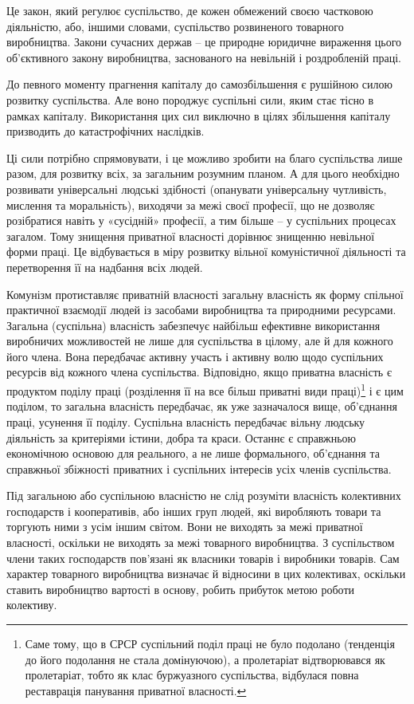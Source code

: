 \documentclass[../main]{subfiles}
\begin{document}
Це закон, який регулює суспільство, де кожен обмежений своєю частковою діяльністю, або, іншими словами, суспільство розвиненого товарного виробництва. Закони сучасних держав – це природне юридичне вираження цього об’єктивного закону виробництва, заснованого на невільній і роздробленій праці.

До певного моменту прагнення капіталу до самозбільшення є рушійною силою розвитку суспільства. Але воно породжує суспільні сили, яким стає тісно в рамках капіталу. Використання цих сил виключно в цілях збільшення капіталу призводить до катастрофічних наслідків.

Ці сили потрібно спрямовувати, і це можливо зробити на благо суспільства лише разом, для розвитку всіх, за загальним розумним планом. А для цього необхідно розвивати універсальні людські здібності (опанувати універсальну чутливість, мислення та моральність), виходячи за межі своєї професії, що не дозволяє розібратися навіть у «сусідній» професії, а тим більше – у суспільних процесах загалом. Тому знищення приватної власності дорівнює знищенню невільної форми праці. Це відбувається в міру розвитку вільної комуністичної діяльності та перетворення її на надбання всіх людей.

Комунізм протиставляє приватній власності загальну власність як форму спільної практичної взаємодії людей із засобами виробництва та природними ресурсами. Загальна (суспільна) власність забезпечує найбільш ефективне використання виробничих можливостей не лише для суспільства в цілому, але й для кожного його члена. Вона передбачає активну участь і активну волю щодо суспільних ресурсів від кожного члена суспільства. Відповідно, якщо приватна власність є продуктом поділу праці (розділення її на все більш приватні види праці)\footnote{Саме тому, що в СРСР суспільний поділ праці не було подолано (тенденція до його подолання не стала домінуючою), а пролетаріат відтворювався як пролетаріат, тобто як клас буржуазного суспільства, відбулася повна реставрація панування приватної власності.} і є цим поділом, то загальна власність передбачає, як уже зазначалося вище, об’єднання праці, усунення її поділу. Суспільна власність передбачає вільну людську діяльність за критеріями істини, добра та краси. Останнє є справжньою економічною основою для реального, а не лише формального, об’єднання та справжньої збіжності приватних і суспільних інтересів усіх членів суспільства.

Під загальною або суспільною власністю не слід розуміти власність колективних господарств і кооперативів, або інших груп людей, які виробляють товари та торгують ними з усім іншим світом. Вони не виходять за межі приватної власності, оскільки не виходять за межі товарного виробництва. З суспільством члени таких господарств пов’язані як власники товарів і виробники товарів. Сам характер товарного виробництва визначає й відносини в цих колективах, оскільки ставить виробництво вартості в основу, робить прибуток метою роботи колективу.
\end{document}
